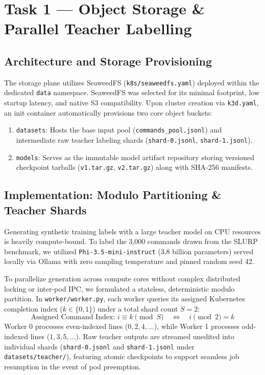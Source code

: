\documentclass[10pt,a4paper]{article}
\begin{document}
\vspace{0.25cm}

\section{Task 1 --- Object Storage \& Parallel Teacher Labelling}

\subsection{Architecture and Storage Provisioning}
The storage plane utilizes SeaweedFS (\texttt{k8s/seaweedfs.yaml}) deployed within the dedicated \texttt{data} namespace. SeaweedFS was selected for its minimal footprint, low startup latency, and native S3 compatibility. Upon cluster creation via \texttt{k3d.yaml}, an init container automatically provisions two core object buckets:
\begin{enumerate}[noitemsep,topsep=2pt,leftmargin=*]
    \item \texttt{datasets}: Hosts the base input pool (\texttt{commands\_pool.jsonl}) and intermediate raw teacher labeling shards (\texttt{shard-0.jsonl}, \texttt{shard-1.jsonl}).
    \item \texttt{models}: Serves as the immutable model artifact repository storing versioned checkpoint tarballs (\texttt{v1.tar.gz}, \texttt{v2.tar.gz}) along with SHA-256 manifests.
\end{enumerate}

\subsection{Implementation: Modulo Partitioning \& Teacher Shards}
Generating synthetic training labels with a large teacher model on CPU resources is heavily compute-bound. To label the 3,000 commands drawn from the SLURP benchmark, we utilized \texttt{Phi-3.5-mini-instruct} (3.8 billion parameters) served locally via Ollama with zero sampling temperature and pinned random seed 42.

To parallelize generation across compute cores without complex distributed locking or inter-pod IPC, we formulated a stateless, deterministic modulo partition. In \texttt{worker/worker.py}, each worker queries its assigned Kubernetes completion index ($k \in \{0, 1\}$) under a total shard count $S = 2$:
$$\text{Assigned Command Index: } i \equiv k \pmod S \quad \iff \quad i \pmod 2 = k$$
Worker 0 processes even-indexed lines ($0, 2, 4, \dots$), while Worker 1 processes odd-indexed lines ($1, 3, 5, \dots$). Raw teacher outputs are streamed unedited into individual shards (\texttt{shard-0.jsonl} and \texttt{shard-1.jsonl} under \texttt{datasets/teacher/}), featuring atomic checkpoints to support seamless job resumption in the event of pod preemption.
\end{document}

